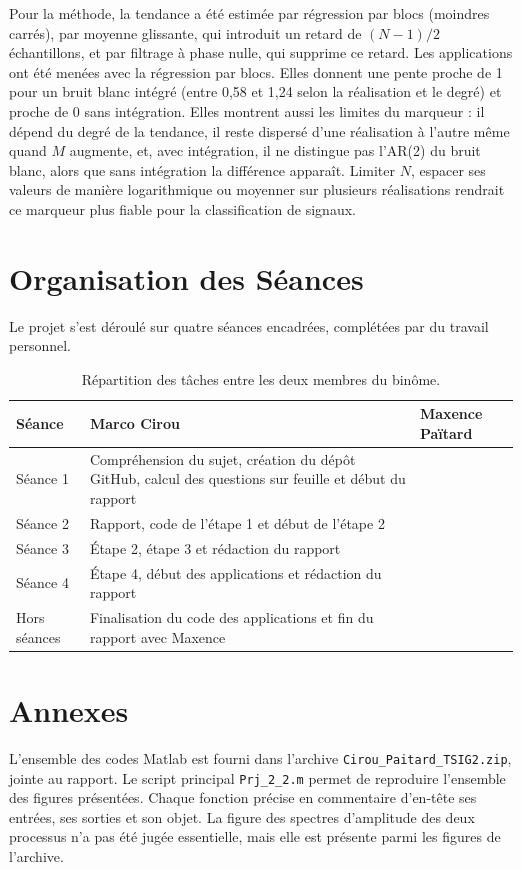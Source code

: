 \documentclass[11pt,a4paper]{article}
\begin{document}
Pour la méthode, la tendance a été estimée par régression par blocs (moindres carrés), par moyenne glissante, qui introduit un retard de $(N-1)/2$ échantillons, et par filtrage à phase nulle, qui supprime ce retard. Les applications ont été menées avec la régression par blocs. Elles donnent une pente proche de 1 pour un bruit blanc intégré (entre 0,58 et 1,24 selon la réalisation et le degré) et proche de 0 sans intégration. Elles montrent aussi les limites du marqueur : il dépend du degré de la tendance, il reste dispersé d'une réalisation à l'autre même quand $M$ augmente, et, avec intégration, il ne distingue pas l'AR(2) du bruit blanc, alors que sans intégration la différence apparaît. Limiter $N$, espacer ses valeurs de manière logarithmique ou moyenner sur plusieurs réalisations rendrait ce marqueur plus fiable pour la classification de signaux.


\section{Organisation des Séances}

Le projet s'est déroulé sur quatre séances encadrées, complétées par du travail personnel.

\begin{table}[H]
  \centering
  \small
  \renewcommand{\arraystretch}{1.6}
  \begin{tabular}{|p{2.4cm}|p{6.2cm}|p{6.2cm}|}
    \hline
    Séance & Marco Cirou & Maxence Païtard \\
    \hline
    Séance 1 & Compréhension du sujet, création du dépôt GitHub, calcul des questions sur feuille et début du rapport & \\
    \hline
    Séance 2 & Rapport, code de l'étape 1 et début de l'étape 2 & \\
    \hline
    Séance 3 & Étape 2, étape 3 et rédaction du rapport & \\
    \hline
    Séance 4 & Étape 4, début des applications et rédaction du rapport & \\
    \hline
    Hors séances & Finalisation du code des applications et fin du rapport avec Maxence & \\
    \hline
  \end{tabular}
  \caption{Répartition des tâches entre les deux membres du binôme.}
  \label{tab:organisation}
\end{table}

\section{Annexes}

L'ensemble des codes Matlab est fourni dans l'archive
\texttt{Cirou\_Paitard\_TSIG2.zip}, jointe au rapport. Le script principal
\texttt{Prj\_2\_2.m} permet de reproduire l'ensemble des figures présentées. Chaque fonction
précise en commentaire d'en-tête ses entrées, ses sorties et son objet.
La figure des spectres d'amplitude des deux processus n'a pas été jugée essentielle, mais elle est présente parmi les figures de l'archive.
\end{document}
